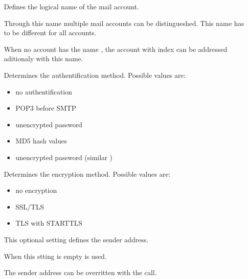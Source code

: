 \begin {description}

    
    Defines the logical name of the mail account.
    
    Through this name multiple mail accounts can be distingueshed. 
    This name has to be different for all accounts.
    
    When no account has the name , the account with index  
    can be addressed aditionaly with this name.
    
    
    Determines the authentification method. Possible values are:
    
    \begin {itemize}
      \item [\var{'none'}] no authentification
      \item [\var{'pop'}] POP3 before SMTP
      \item [\var{'plain'}] unencrypted password
      \item [\var{'cram-md5'}] MD5 hash values
      \item [\var{'login'}] unencrypted password (similar )
    \end {itemize}
    

    Determines the encryption method. Possible values are:
    
    \begin {itemize}
      \item [\var{'none'}] no encryption
      \item [\var{'TLS'}] SSL/TLS
      \item [\var{'STARTTLS'}] TLS with STARTTLS
    \end {itemize}


    This optional setting defines the sender address.
    
    When this stting is empty 
     is used.
    
    The sender address can be overritten with the  call. 
 
\end{description}

